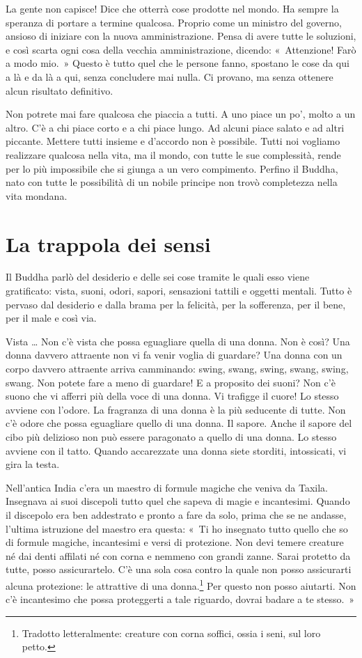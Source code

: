 La gente non capisce! Dice che otterrà cose prodotte nel mondo. Ha
sempre la speranza di portare a termine qualcosa. Proprio come un
ministro del governo, ansioso di iniziare con la nuova amministrazione.
Pensa di avere tutte le soluzioni, e così scarta ogni cosa della vecchia
amministrazione, dicendo: «~Attenzione! Farò a modo mio.~» Questo è
tutto quel che le persone fanno, spostano le cose da qui a là e da là a
qui, senza concludere mai nulla. Ci provano, ma senza ottenere alcun
risultato definitivo.

Non potrete mai fare qualcosa che piaccia a tutti. A uno piace un po',
molto a un altro. C'è a chi piace corto e a chi piace lungo. Ad alcuni
piace salato e ad altri piccante. Mettere tutti insieme e d'accordo non
è possibile. Tutti noi vogliamo realizzare qualcosa nella vita, ma il
mondo, con tutte le sue complessità, rende per lo più impossibile che si
giunga a un vero compimento. Perfino il Buddha, nato con tutte le
possibilità di un nobile principe non trovò completezza nella vita
mondana.

\section{La trappola dei sensi}

Il Buddha parlò del desiderio e delle sei cose tramite le quali esso
viene gratificato: vista, suoni, odori, sapori, sensazioni tattili e
oggetti mentali. Tutto è pervaso dal desiderio e dalla brama per la
felicità, per la sofferenza, per il bene, per il male e così via.

Vista \ldots{} Non c'è vista che possa eguagliare quella di una donna. Non è
così? Una donna davvero attraente non vi fa venir voglia di guardare?
Una donna con un corpo davvero attraente arriva camminando: swing,
swang, swing, swang, swing, swang. Non potete fare a meno di guardare! E
a proposito dei suoni? Non c'è suono che vi afferri più della voce di
una donna. Vi trafigge il cuore! Lo stesso avviene con l'odore. La
fragranza di una donna è la più seducente di tutte. Non c'è odore che
possa eguagliare quello di una donna. Il sapore. Anche il sapore del
cibo più delizioso non può essere paragonato a quello di una donna. Lo
stesso avviene con il tatto. Quando accarezzate una donna siete
storditi, intossicati, vi gira la testa.

Nell'antica India c'era un maestro di formule magiche che veniva da
Taxila. Insegnava ai suoi discepoli tutto quel che sapeva di magie e
incantesimi. Quando il discepolo era ben addestrato e pronto a fare da
solo, prima che se ne andasse, l'ultima istruzione del maestro era
questa: «~Ti ho insegnato tutto quello che so di formule magiche,
incantesimi e versi di protezione. Non devi temere creature né dai denti
affilati né con corna e nemmeno con grandi zanne. Sarai protetto da
tutte, posso assicurartelo. C'è una sola cosa contro la quale non posso
assicurarti alcuna protezione: le attrattive di una donna.\footnote{Tradotto
  letteralmente: creature con corna soffici, ossia i seni, sul loro
  petto.} Per questo non posso aiutarti. Non c'è incantesimo che possa
proteggerti a tale riguardo, dovrai badare a te stesso.~»


